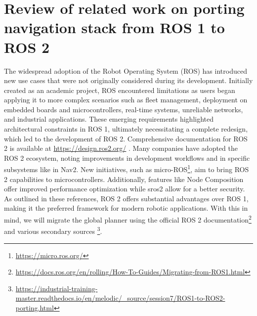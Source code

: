 \chapter{Review of related work on porting navigation stack from ROS 1 to ROS 2}
The widespread adoption of the Robot Operating System (ROS) has introduced new use cases that were not originally considered during its development. Initially created as an academic project, ROS encountered limitations as users began applying it to more complex scenarios such as fleet management, deployment on embedded boards and microcontrollers, real-time systems, unreliable networks, and industrial applications. These emerging requirements highlighted architectural constraints in ROS 1, ultimately necessitating a complete redesign, which led to the development of ROS 2. Comprehensive documentation for ROS 2 is available at \href{https://design.ros2.org/}{https://design.ros2.org/} . Many companies have adopted the ROS 2 ecosystem, noting improvements in development workflows\cite{Macenski_2022} and in specific subsystems like in  Nav2\cite{macenski2023survey}. New initiatives, such as micro-ROS\footnote{\href{https://micro.ros.org/}{https://micro.ros.org/}}, aim to bring ROS 2 capabilities to microcontrollers. Additionally, features like Node Composition offer improved performance optimization\cite{macenski2023impactros2node} while sros2 allow for a better security\cite{vilches2022sros2usablecybersecurity}.
As outlined in these references, ROS 2 offers substantial advantages over ROS 1, making it the preferred framework for modern robotic applications. With this in mind, we will migrate the global planner using the official ROS 2 documentation\footnote{\href{https://docs.ros.org/en/rolling/How-To-Guides/Migrating-from-ROS1.html}{https://docs.ros.org/en/rolling/How-To-Guides/Migrating-from-ROS1.html}} and various secondary sources \footnote{\href{https://industrial-training-master.readthedocs.io/en/melodic/\_source/session7/ROS1-to-ROS2-porting.html}{https://industrial-training-master.readthedocs.io/en/melodic/\_source/session7/ROS1-to-ROS2-porting.html}}. 

